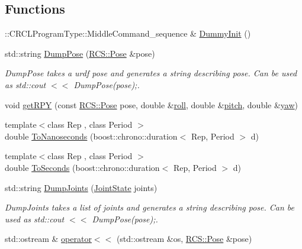 \subsection*{Functions}
\begin{DoxyCompactItemize}
\item 
\-::C\-R\-C\-L\-Program\-Type\-::\-Middle\-Command\-\_\-sequence \& \hyperlink{namespaceRCS_a0d81b5ae27814995884c1d25619db28a}{Dummy\-Init} ()
\item 
std\-::string \hyperlink{namespaceRCS_a35eaff1f2c8ec5520f595d6f3b2d38b3}{Dump\-Pose} (\hyperlink{namespaceRCS_aa07e45d8a50e30064283d2b38087f999}{R\-C\-S\-::\-Pose} \&pose)
\begin{DoxyCompactList}\small\item\em Dump\-Pose takes a urdf pose and generates a string describing pose. Can be used as std\-::cout $<$$<$ Dump\-Pose(pose);. \end{DoxyCompactList}\item 
void \hyperlink{namespaceRCS_a6e911197b35a4857f179af61811d4b0a}{get\-R\-P\-Y} (const \hyperlink{namespaceRCS_aa07e45d8a50e30064283d2b38087f999}{R\-C\-S\-::\-Pose} pose, double \&\hyperlink{SanityCheckTests_8cpp_a1d3228afa3a1d6773954f40c1e519eb9}{roll}, double \&\hyperlink{SanityCheckTests_8cpp_a34c057a0378030db67bd6a129f37d938}{pitch}, double \&\hyperlink{SanityCheckTests_8cpp_a21cd490f6191f66678f55b4c242a10cf}{yaw})
\item 
{\footnotesize template$<$class Rep , class Period $>$ }\\double \hyperlink{namespaceRCS_a1d588bfecc6b5d8e671ad9c57d18ecdc}{To\-Nanoseconds} (boost\-::chrono\-::duration$<$ Rep, Period $>$ d)
\item 
{\footnotesize template$<$class Rep , class Period $>$ }\\double \hyperlink{namespaceRCS_a82f7cfa7edd613a454281ce5f5685b4d}{To\-Seconds} (boost\-::chrono\-::duration$<$ Rep, Period $>$ d)
\item 
std\-::string \hyperlink{namespaceRCS_ad467dfc15b94a5e025af3e094ac21860}{Dump\-Joints} (\hyperlink{RCS_8h_aa4adb93a26caa4dacba9c9614e283245}{Joint\-State} joints)
\begin{DoxyCompactList}\small\item\em Dump\-Joints takes a list of joints and generates a string describing pose. Can be used as std\-::cout $<$$<$ Dump\-Pose(pose);. \end{DoxyCompactList}\item 
std\-::ostream \& \hyperlink{namespaceRCS_af0cfadb4002d5ba5ec3ffdf2c96839e0}{operator$<$$<$} (std\-::ostream \&os, \hyperlink{namespaceRCS_aa07e45d8a50e30064283d2b38087f999}{R\-C\-S\-::\-Pose} \&pose)

\end{DoxyCompactItemize}
